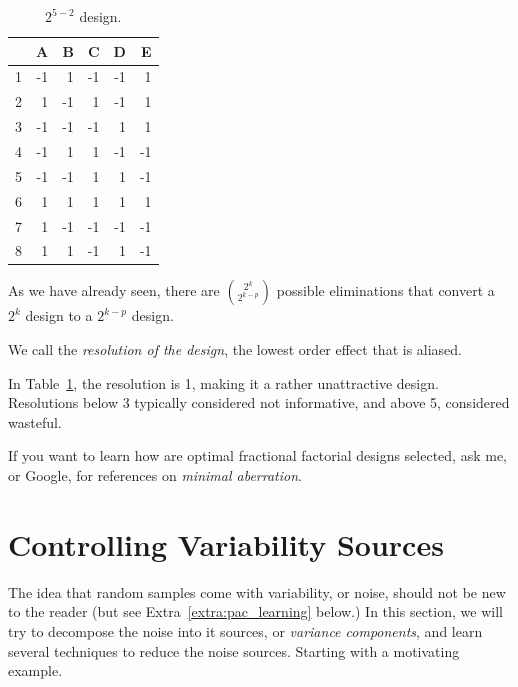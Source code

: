 \begin{table}[ht]
\centering
\begin{tabular}{rrrrrr}
  \hline
 & A & B & C & D & E \\ 
  \hline
1 & -1 & 1 & -1 & -1 & 1 \\ 
  2 & 1 & -1 & 1 & -1 & 1 \\ 
  3 & -1 & -1 & -1 & 1 & 1 \\ 
  4 & -1 & 1 & 1 & -1 & -1 \\ 
  5 & -1 & -1 & 1 & 1 & -1 \\ 
  6 & 1 & 1 & 1 & 1 & 1 \\ 
  7 & 1 & -1 & -1 & -1 & -1 \\ 
  8 & 1 & 1 & -1 & 1 & -1 \\ 
   \hline
\end{tabular}
\label{tab:partial_factorial_ii}
\caption{$2^{5-2}$ design.}
\end{table}


As we have already seen, there are $\binom{2^k}{2^{k-p}}$ possible eliminations that convert a $2^k$ design to a $2^{k-p}$ design.
\begin{definition}
We call the \emph{resolution of the design}, the lowest order effect that is aliased. 
\end{definition}
In Table~\ref{tab:partial_factorial_ii}, the resolution is 1, making it a rather unattractive design. 
Resolutions below 3 typically considered not informative, and above 5, considered wasteful.


\begin{extra}
If you want to learn how are optimal fractional factorial designs selected, ask me, or Google, for references on \emph{minimal aberration}.
\end{extra}







\section{Controlling Variability Sources}
The idea that random samples come with variability, or noise, should not be new to the reader (but see Extra~\ref{extra:pac_learning} below.)
In this section, we will try to decompose the noise into it sources, or \emph{variance components}, and learn several techniques to reduce the noise sources.
Starting with a motivating example.


